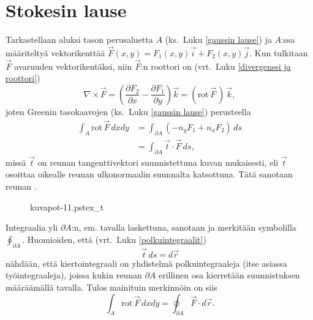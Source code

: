 \section{Stokesin lause} \label{stokesin lause}
\alku
{}

Tarkastellaan aluksi tason perusaluetta $A$ (ks.\ Luku \ref{gaussin lause}) ja $A$:ssa
määriteltyä vektorikenttää $\vec F(x,y)=F_1(x,y)\vec i + F_2(x,y)\vec j$. Kun tulkitaan $\vec F$
avaruuden vektorikentäksi, niin $\vec F$:n roottori on
(vrt.\ Luku \ref{divergenssi ja roottori})
\[
\nabla\times\vec F
    =\left(\frac{\partial F_2}{\partial x}- \frac{\partial F_1}{\partial y}\right)\vec k
    =(\text{rot}\,\vec F\,)\,\vec k,
\]
joten Greenin tasokaavojen (ks.\ Luku \ref{gaussin lause}) perusteella
\begin{align*}
\int_A \text{rot}\,\vec F\,dxdy &= \int_{\partial A} (-n_yF_1+n_xF_2)\,ds \\
&= \int_{\partial A} \vec t\cdot\vec F\,ds,
\end{align*}
missä $\vec t$ on reunan tangenttivektori suunnistettuna kuvan mukaisesti, eli $\vec t$ osoittaa
oikealle reunan ulkonormaalin suunnalta katsottuna. Tätä sanotaan reunan 
%
.
\begin{figure}[H]
\begin{center}
{kuvapot-11.pstex_t}
\end{center}
\end{figure}
Integraalia yli $\partial A$:n, em. tavalla laskettuna, sanotaan 
ja merkitään symbolilla $\oint_{\partial A}$. Huomioiden, että
(vrt.\ Luku \ref{polkuintegraalit})
\[
\vec t\,ds=d\vec r
\] 
nähdään, että kiertointegraali on yhdistelmä polkuintegraaleja (itse asiassa työintegraaleja),
joissa kukin reunan $\partial A$ erillinen osa kierretään suunnistuksen määräämällä tavalla.
Tulos mainituin merkinnöin on siis
\begin{equation} \label{Stokesin tasokaava}
\int_A \text{rot}\,\vec F\,dxdy=\oint_{\partial A} \vec F\cdot d\vec r.
\end{equation}

